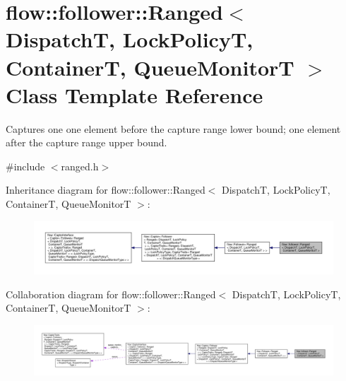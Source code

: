 \hypertarget{classflow_1_1follower_1_1_ranged}{}\section{flow\+:\+:follower\+:\+:Ranged$<$ DispatchT, Lock\+PolicyT, ContainerT, Queue\+MonitorT $>$ Class Template Reference}
\label{classflow_1_1follower_1_1_ranged}


Captures one one element before the capture range lower bound; one element after the capture range upper bound.  




{\ttfamily \#include $<$ranged.\+h$>$}



Inheritance diagram for flow\+:\+:follower\+:\+:Ranged$<$ DispatchT, Lock\+PolicyT, ContainerT, Queue\+MonitorT $>$\+:
\nopagebreak
\begin{figure}[H]
\begin{center}
\leavevmode
\includegraphics[width=350pt]{classflow_1_1follower_1_1_ranged__inherit__graph}
\end{center}
\end{figure}


Collaboration diagram for flow\+:\+:follower\+:\+:Ranged$<$ DispatchT, Lock\+PolicyT, ContainerT, Queue\+MonitorT $>$\+:
\nopagebreak
\begin{figure}[H]
\begin{center}
\leavevmode
\includegraphics[width=350pt]{classflow_1_1follower_1_1_ranged__coll__graph}
\end{center}
\end{figure}
